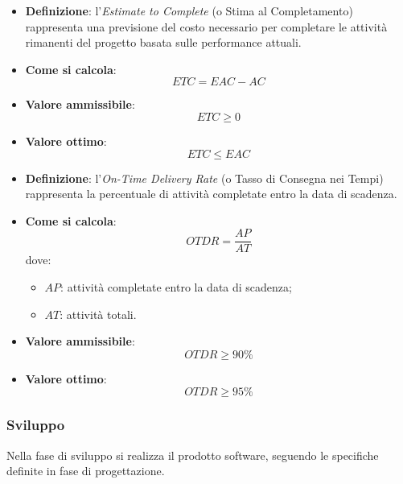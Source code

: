 \hypertarget{9M}{}
\begin{itemize}
	\item \textbf{Definizione}: l'\textit{Estimate to Complete} (o Stima al Completamento) rappresenta una previsione del costo necessario per completare le attività rimanenti del progetto basata sulle performance attuali.
	\item \textbf{Come si calcola}: \begin{equation*}ETC = EAC - AC\end{equation*}
	\item \textbf{Valore ammissibile}: \begin{equation*}ETC \geq 0\end{equation*}
	\item \textbf{Valore ottimo}: \begin{equation*}ETC \leq EAC\end{equation*}
\end{itemize}

\hypertarget{10M}{}
\begin{itemize}
	\item \textbf{Definizione}: l'\textit{On-Time Delivery Rate} (o Tasso di Consegna nei Tempi) rappresenta la percentuale di attività completate entro la data di scadenza.
	\item \textbf{Come si calcola}: \begin{equation*}OTDR = \frac{AP}{AT}\end{equation*} dove:
		\begin{itemize}
			\item $AP$: attività completate entro la data di scadenza;
			\item $AT$: attività totali.
		\end{itemize}
	\item \textbf{Valore ammissibile}: \begin{equation*}OTDR \geq 90\%\end{equation*}
	\item \textbf{Valore ottimo}: \begin{equation*}OTDR \geq 95\%\end{equation*}
\end{itemize}



\subsubsection{Sviluppo}
Nella fase di sviluppo si realizza il prodotto software, seguendo le specifiche definite in fase di progettazione.

